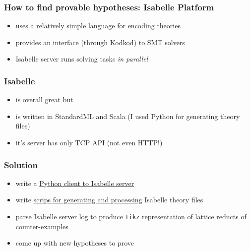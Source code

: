 \documentclass{beamer}
\begin{document}
\begin{frame}
\frametitle{How to find provable hypotheses: Isabelle Platform}
\begin{itemize}
\item uses a relatively simple \href{https://github.com/inpefess/residuated-binars/blob/master/involution/task10/T88.thy}{language} for encoding theories
\item provides an interface (through Kodkod) to SMT solvers
\item Isabelle server runs solving tasks \emph{in parallel}
\end{itemize}
\end{frame}
\begin{frame}
\frametitle{Isabelle}
\begin{itemize}
\item is overall great but
\item is written in StandardML and Scala (I used Python for generating theory files)
\item it's server has only TCP API (not even HTTP!)
\end{itemize}
\end{frame}
\begin{frame}
\frametitle{Solution}
\begin{itemize}
\item write a \href{https://github.com/inpefess/isabelle-client}{Python client to Isabelle server}
\item write \href{https://github.com/inpefess/residuated-binars}{scrips for generating and processing} Isabelle theory files
\item parse Isabelle server \href{https://github.com/inpefess/residuated-binars/blob/master/involution/task10/isabelle.out}{log} to produce \texttt{tikz} representation of lattice reducts of counter-examples
\item come up with new hypotheses to prove
\end{itemize}
\end{frame}
\end{document}
